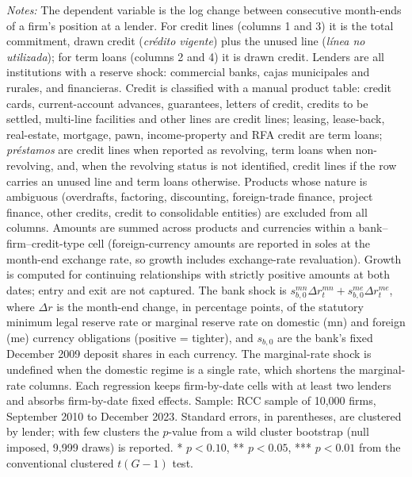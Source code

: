 \begin{table}[!h]
\begin{threeparttable}[b]
      \begin{tablenotes}\item \textit{Notes:} The dependent variable is the log change between consecutive month-ends of a firm's position at a lender. For credit lines (columns 1 and 3) it is the total commitment, drawn credit (\textit{cr\'edito vigente}) plus the unused line (\textit{l\'inea no utilizada}); for term loans (columns 2 and 4) it is drawn credit. Lenders are all institutions with a reserve shock: commercial banks, cajas municipales and rurales, and financieras. Credit is classified with a manual product table: credit cards, current-account advances, guarantees, letters of credit, credits to be settled, multi-line facilities and other lines are credit lines; leasing, lease-back, real-estate, mortgage, pawn, income-property and RFA credit are term loans; \textit{pr\'estamos} are credit lines when reported as revolving, term loans when non-revolving, and, when the revolving status is not identified, credit lines if the row carries an unused line and term loans otherwise. Products whose nature is ambiguous (overdrafts, factoring, discounting, foreign-trade finance, project finance, other credits, credit to consolidable entities) are excluded from all columns. Amounts are summed across products and currencies within a bank--firm--credit-type cell (foreign-currency amounts are reported in soles at the month-end exchange rate, so growth includes exchange-rate revaluation). Growth is computed for continuing relationships with strictly positive amounts at both dates; entry and exit are not captured. The bank shock is $s^{mn}_{b,0}\Delta r^{mn}_{t}+s^{me}_{b,0}\Delta r^{me}_{t}$, where $\Delta r$ is the month-end change, in percentage points, of the statutory minimum legal reserve rate or marginal reserve rate on domestic (mn) and foreign (me) currency obligations (positive = tighter), and $s_{b,0}$ are the bank's fixed December 2009 deposit shares in each currency. The marginal-rate shock is undefined when the domestic regime is a single rate, which shortens the marginal-rate columns. Each regression keeps firm-by-date cells with at least two lenders and absorbs firm-by-date fixed effects. Sample: RCC sample of 10,000 firms, September 2010 to December 2023. Standard errors, in parentheses, are clustered by lender; with few clusters the $p$-value from a wild cluster bootstrap (null imposed, 9,999 draws) is reported. * $p<0.10$, ** $p<0.05$, *** $p<0.01$ from the conventional clustered $t(G-1)$ test.
      \end{tablenotes}
   \end{threeparttable}
\end{table}


